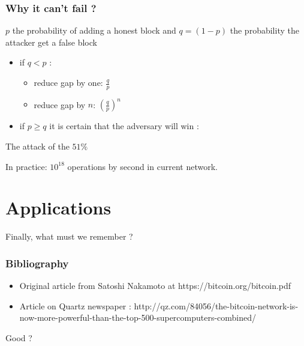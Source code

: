 \documentclass[12pt]{beamer}
\begin{document}
\begin{frame}
\frametitle{Why it can't fail ?}
$p$ the probability of adding a honest block and $q = (1-p)$ the probability the attacker get a false block
\begin{itemize}
\item if $q < p$ :
\begin{itemize}
\item reduce gap by one: $\frac{q}{p}$
\item reduce gap by $n$: $\left (\frac{q}{p}\right )^n$
\end{itemize}
\item if $p \ge q$ it is certain that the adversary will win : 
\end{itemize}
\begin{center}
\color{red!50!black} \large The attack of the $51\%$
\end{center}

In practice: $10^{18}$ operations by second in current network.

\end{frame}

\section{Applications}

\begin{frame}
Finally, what must we remember ? %
\end{frame}

\begin{frame}
\frametitle{Bibliography}
\begin{itemize}
\item Original article from Satoshi Nakamoto at https://bitcoin.org/bitcoin.pdf
\item Article on Quartz newspaper : http://qz.com/84056/the-bitcoin-network-is-now-more-powerful-than-the-top-500-supercomputers-combined/
\end{itemize}

\end{frame}

\begin{frame}


Good ?

\end{frame}
\end{document}
